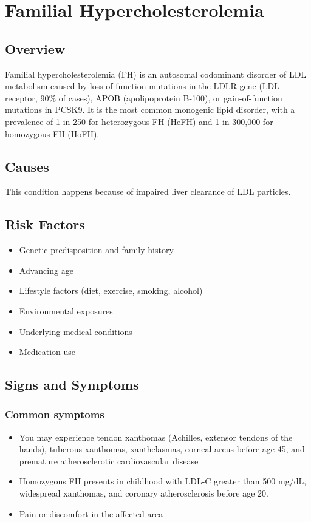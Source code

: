 \chapter{Familial Hypercholesterolemia}
\label{sec:Familial Hypercholesterolemia}

\section{Overview}
Familial hypercholesterolemia (FH) is an autosomal codominant disorder of LDL metabolism caused by loss-of-function mutations in the LDLR gene (LDL receptor, 90\% of cases), APOB (apolipoprotein B-100), or gain-of-function mutations in PCSK9. It is the most common monogenic lipid disorder, with a prevalence of 1 in 250 for heterozygous FH (HeFH) and 1 in 300,000 for homozygous FH (HoFH).
\section{Causes}
This condition happens because of impaired liver clearance of LDL particles.     
\section{Risk Factors}

\begin{itemize}[noitemsep]
  \item Genetic predisposition and family history
  \item Advancing age
  \item Lifestyle factors (diet, exercise, smoking, alcohol)
  \item Environmental exposures
  \item Underlying medical conditions
  \item Medication use
\end{itemize}
\section{Signs and Symptoms}

\subsection{Common symptoms}
\begin{itemize}[noitemsep]
  \item You may experience tendon xanthomas (Achilles, extensor tendons of the hands), tuberous xanthomas, xanthelasmas, corneal arcus before age 45, and premature atherosclerotic cardiovascular disease
  \item Homozygous FH presents in childhood with LDL-C greater than 500 mg/dL, widespread xanthomas, and coronary atherosclerosis before age 20.
  \item Pain or discomfort in the affected area
  \end{itemize}

